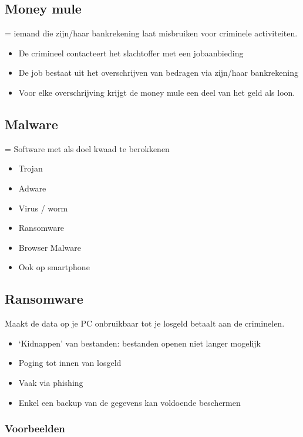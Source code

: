 \documentclass{article}
\begin{document}
\subsection{Money mule}
= iemand die zijn/haar bankrekening laat misbruiken voor criminele activiteiten. 

\begin{itemize}
    \item De crimineel contacteert het slachtoffer met een jobaanbieding
    \item De job bestaat uit het overschrijven van bedragen via zijn/haar bankrekening
    \item Voor elke overschrijving krijgt de money mule een deel van het geld als loon.
\end{itemize}

\subsection{Malware}
= Software met als doel kwaad te berokkenen

\begin{itemize}
    \item Trojan
    \item Adware
    \item Virus / worm
    \item Ransomware
    \item Browser Malware
    \item Ook op smartphone
\end{itemize}

\subsection{Ransomware}
Maakt de data op je PC onbruikbaar tot je losgeld betaalt aan de criminelen.

\begin{itemize}
    \item `Kidnappen' van bestanden: bestanden openen niet langer mogelijk
    \item Poging tot innen van losgeld
    \item Vaak via phishing
    \item Enkel een backup van de gegevens kan voldoende beschermen
\end{itemize}

\subsubsection{Voorbeelden}
\end{document}
